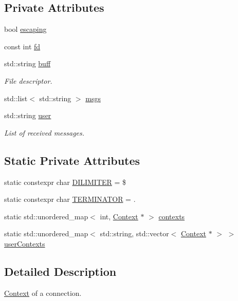 \subsection*{Private Attributes}
\begin{DoxyCompactItemize}
\item 
bool \hyperlink{classContext_a5f34f6e7fc17f613087021f52e2154f9}{escaping}
\item 
const int \hyperlink{classContext_aaf11c36966be14b2e1e53ee43c8e91dd}{fd}
\item 
std\+::string \hyperlink{classContext_a61817df359b6ed50d1a255648c80fd58}{buff}
\begin{DoxyCompactList}\small\item\em File descriptor. \end{DoxyCompactList}\item 
std\+::list$<$ std\+::string $>$ \hyperlink{classContext_a24115a22c1e187f610f41d9542b3516a}{msgs}
\item 
std\+::string \hyperlink{classContext_a8525c6ece0d6a53339ef8a59c1cfd668}{user}
\begin{DoxyCompactList}\small\item\em List of received messages. \end{DoxyCompactList}\end{DoxyCompactItemize}
\subsection*{Static Private Attributes}
\begin{DoxyCompactItemize}
\item 
static constexpr char \hyperlink{classContext_a63a0ff9017aba4c0d9551900093ee057}{D\+I\+L\+I\+M\+I\+T\+ER} = \textquotesingle{}\$\textquotesingle{}
\item 
static constexpr char \hyperlink{classContext_a5a12ec226a7135dc356ab34745a3f5df}{T\+E\+R\+M\+I\+N\+A\+T\+OR} = \textquotesingle{}.\textquotesingle{}
\item 
static std\+::unordered\+\_\+map$<$ int, \hyperlink{classContext}{Context} $\ast$ $>$ \hyperlink{classContext_abab3c078973688455f584747769f14fe}{contexts}
\item 
static std\+::unordered\+\_\+map$<$ std\+::string, std\+::vector$<$ \hyperlink{classContext}{Context} $\ast$ $>$ $>$ \hyperlink{classContext_a73f2f8250661a88e254e49a266f6a705}{user\+Contexts}
\end{DoxyCompactItemize}


\subsection{Detailed Description}
\hyperlink{classContext}{Context} of a connection. 

